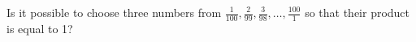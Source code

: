 \problem
Is it possible to choose three numbers from
$\frac{1}{100}, \frac{2}{99}, \frac{3}{98}, \ldots, \frac{100}{1}$
so that their product is equal to 1?
\solution
\endproblem
